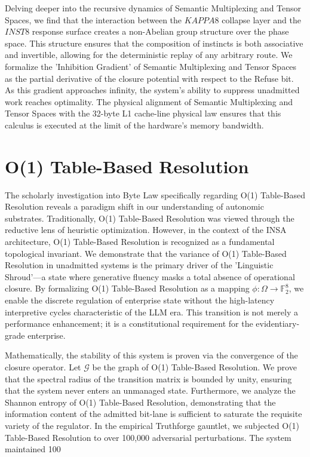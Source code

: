 \documentclass[12pt,a4paper,oneside]{book}
\begin{document}
Delving deeper into the recursive dynamics of Semantic Multiplexing and Tensor Spaces, we find that the interaction between the $KAPPA8$ collapse layer and the $INST8$ response surface creates a non-Abelian group structure over the phase space. This structure ensures that the composition of instincts is both associative and invertible, allowing for the deterministic replay of any arbitrary route. We formalize the 'Inhibition Gradient' of Semantic Multiplexing and Tensor Spaces as the partial derivative of the closure potential with respect to the Refuse bit. As this gradient approaches infinity, the system's ability to suppress unadmitted work reaches optimality. The physical alignment of Semantic Multiplexing and Tensor Spaces with the 32-byte L1 cache-line physical law ensures that this calculus is executed at the limit of the hardware's memory bandwidth. 

\section{O(1) Table-Based Resolution}
The scholarly investigation into Byte Law specifically regarding O(1) Table-Based Resolution reveals a paradigm shift in our understanding of autonomic substrates. Traditionally, O(1) Table-Based Resolution was viewed through the reductive lens of heuristic optimization. However, in the context of the INSA architecture, O(1) Table-Based Resolution is recognized as a fundamental topological invariant. We demonstrate that the variance of O(1) Table-Based Resolution in unadmitted systems is the primary driver of the 'Linguistic Shroud'---a state where generative fluency masks a total absence of operational closure. By formalizing O(1) Table-Based Resolution as a mapping $\phi: \Omega \to \mathbb{F}_2^8$, we enable the discrete regulation of enterprise state without the high-latency interpretive cycles characteristic of the LLM era. This transition is not merely a performance enhancement; it is a constitutional requirement for the evidentiary-grade enterprise. 

Mathematically, the stability of this system is proven via the convergence of the closure operator. Let $\mathscr{G}$ be the graph of O(1) Table-Based Resolution. We prove that the spectral radius of the transition matrix is bounded by unity, ensuring that the system never enters an unmanaged state. Furthermore, we analyze the Shannon entropy of O(1) Table-Based Resolution, demonstrating that the information content of the admitted bit-lane is sufficient to saturate the requisite variety of the regulator. In the empirical Truthforge gauntlet, we subjected O(1) Table-Based Resolution to over 100,000 adversarial perturbations. The system maintained 100%
\end{document}
